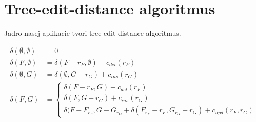 
\chapter{Tree-edit-distance algoritmus}

Jadro nasej aplikacie tvori tree-edit-distance algoritmus. 


\begin{align*}
\delta(\emptyset, \emptyset) &=
	0 \\
\delta(F, \emptyset) &=
	\delta(F - r_{F}, \emptyset) + c_{del}(r_{F}) \\
\delta(\emptyset, G) &=
	\delta(\emptyset, G - r_{G}) + c_{ins}(r_{G}) \\
\delta(F, G) &=
	\begin{cases}
	\delta(F - r_{F}, G) + c_{del}(r_{F}) \\
	\delta(F, G - r_{G}) + c_{ins}(r_{G}) \\
	\delta(F - F_{r_{F}}, G - G_{r_{G}} +
		\delta(F_{r_{F}} - r_{F}, G_{r_{G}} - r_{G}) + c_{upd}(r_{F}, r_{G})
	\end{cases}
\end{align*}
\citet{RTED}
